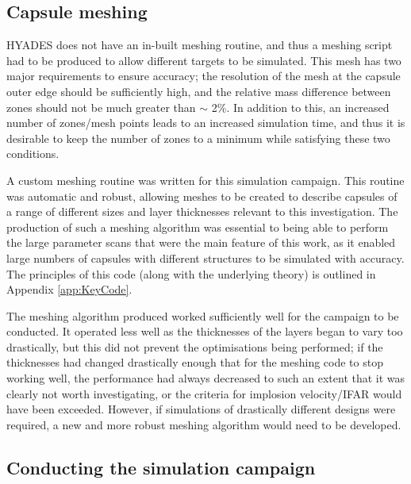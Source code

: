 \subsection{Capsule meshing}

HYADES does not have an in-built meshing routine, and thus a meshing script had to be produced to allow different targets to be simulated. This mesh has two major requirements to ensure accuracy; the resolution of the mesh at the capsule outer edge should be sufficiently high, and the relative mass difference between zones should not be much greater than $\sim$ 2\%. In addition to this, an increased number of zones/mesh points leads to an increased simulation time, and thus it is desirable to keep the number of zones to a minimum while satisfying these two conditions.

A custom meshing routine was written for this simulation campaign. This routine was automatic and robust, allowing meshes to be created to describe capsules of a range of different sizes and layer thicknesses relevant to this investigation. The production of such a meshing algorithm was essential to being able to perform the large parameter scans that were the main feature of this work, as it enabled large numbers of capsules with different structures to be simulated with accuracy. The principles of this code (along with the underlying theory) is outlined in Appendix \ref{app:KeyCode}.

The meshing algorithm produced worked sufficiently well for the campaign to be conducted. It operated less well as the thicknesses of the layers began to vary too drastically, but this did not prevent the optimisations being performed; if the thicknesses had changed drastically enough that for the meshing code to stop working well, the performance had always decreased to such an extent that it was clearly not worth investigating, or the criteria for implosion velocity/IFAR would have been exceeded. However, if simulations of drastically different designs were required, a new and more robust meshing algorithm would need to be developed.

\subsection{Conducting the simulation campaign}

